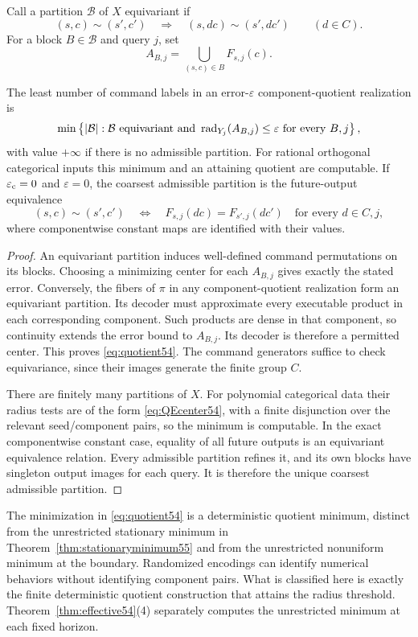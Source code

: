 Call a partition $\mathcal B$ of $X$ equivariant if
\[
 (s,c)\sim(s',c')\quad\Longrightarrow\quad
 (s,dc)\sim(s',dc')\qquad(d\in C).
\]
For a block $B\in\mathcal B$ and query $j$, set
\[
 A_{B,j}=\bigcup_{(s,c)\in B}F_{s,j}(c).
\]
\begin{theorem}\label{thm:quotient54}
The least number of command labels in an error-$\varepsilon$ component-quotient realization is
\begin{equation}\label{eq:quotient54}
 \min\left\{|\mathcal B|:\mathcal B\text{ equivariant and }
         \operatorname{rad}_{Y_j}(A_{B,j})\le\varepsilon\text{ for every }B,j\right\},
\end{equation}
with value $+\infty$ if there is no admissible partition. For rational orthogonal categorical inputs this minimum and an attaining quotient are computable. If $\varepsilon_{\mathrm c}=0$ and $\varepsilon=0$, the coarsest admissible partition is the future-output equivalence
\[
 (s,c)\sim(s',c')\quad\Longleftrightarrow\quad
 F_{s,j}(dc)=F_{s',j}(dc')\quad\text{for every }d\in C,j,
\]
where componentwise constant maps are identified with their values.
\end{theorem}
\begin{proof}
An equivariant partition induces well-defined command permutations on its blocks. Choosing a minimizing center for each $A_{B,j}$ gives exactly the stated error. Conversely, the fibers of $\pi$ in any component-quotient realization form an equivariant partition. Its decoder must approximate every executable product in each corresponding component. Such products are dense in that component, so continuity extends the error bound to $A_{B,j}$. Its decoder is therefore a permitted center. This proves \eqref{eq:quotient54}. The command generators suffice to check equivariance, since their images generate the finite group $C$.

There are finitely many partitions of $X$. For polynomial categorical data their radius tests are of the form \eqref{eq:QEcenter54}, with a finite disjunction over the relevant seed/component pairs, so the minimum is computable. In the exact componentwise constant case, equality of all future outputs is an equivariant equivalence relation. Every admissible partition refines it, and its own blocks have singleton output images for each query. It is therefore the unique coarsest admissible partition.
\end{proof}
The minimization in \eqref{eq:quotient54} is a deterministic quotient minimum, distinct from the unrestricted stationary minimum in Theorem~\ref{thm:stationaryminimum55} and from the unrestricted nonuniform minimum at the boundary. Randomized encodings can identify numerical behaviors without identifying component pairs. What is classified here is exactly the finite deterministic quotient construction that attains the radius threshold. Theorem~\ref{thm:effective54}(4) separately computes the unrestricted minimum at each fixed horizon.

